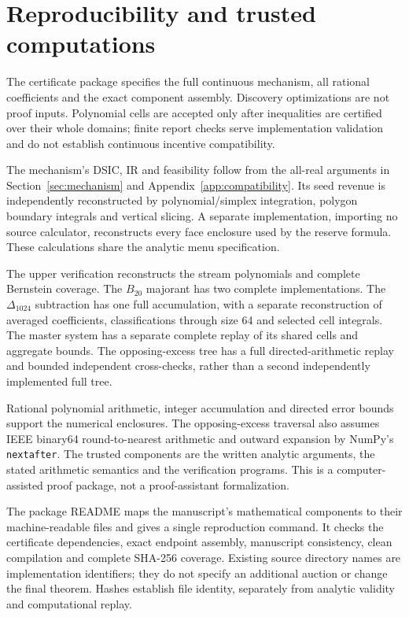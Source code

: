 \documentclass[11pt]{article}
\begin{document}
\section{Reproducibility and trusted computations}\label{sec:reproduction}
The certificate package specifies the full continuous mechanism, all rational
coefficients and the exact component assembly. Discovery optimizations are
not proof inputs. Polynomial cells are accepted only after inequalities are
certified over their whole domains; finite report checks serve implementation
validation and do not establish continuous incentive compatibility.

The mechanism's DSIC, IR and feasibility follow from the all-real arguments
in Section~\ref{sec:mechanism} and Appendix~\ref{app:compatibility}. Its seed
revenue is independently reconstructed by polynomial/simplex integration,
polygon boundary integrals and vertical slicing. A separate implementation,
importing no source calculator, reconstructs every face enclosure used by the
reserve formula. These calculations share the analytic menu specification.

The upper verification reconstructs the stream polynomials and complete
Bernstein coverage. The $B_{20}$ majorant has two complete implementations.
The $\Delta_{1024}$ subtraction has one full accumulation, with a separate
reconstruction of averaged coefficients, classifications through size 64 and
selected cell integrals. The master system has a separate complete replay
of its shared cells and aggregate bounds. The opposing-excess tree has a full
directed-arithmetic replay and bounded independent cross-checks, rather than
a second independently implemented full tree.

Rational polynomial arithmetic, integer accumulation and directed error
bounds support the numerical enclosures. The opposing-excess traversal also
assumes IEEE binary64 round-to-nearest arithmetic and outward expansion by
NumPy's \texttt{nextafter}. The trusted components are the written analytic
arguments, the stated arithmetic semantics and the verification programs.
This is a computer-assisted proof package, not a proof-assistant formalization.

The package README maps the manuscript's mathematical components to their
machine-readable files and gives a single reproduction command. It checks
the certificate dependencies, exact endpoint assembly, manuscript consistency,
clean compilation and complete SHA-256 coverage. Existing source directory
names are implementation identifiers; they do not specify an additional
auction or change the final theorem. Hashes establish file identity,
separately from analytic validity and computational replay.
\end{document}
